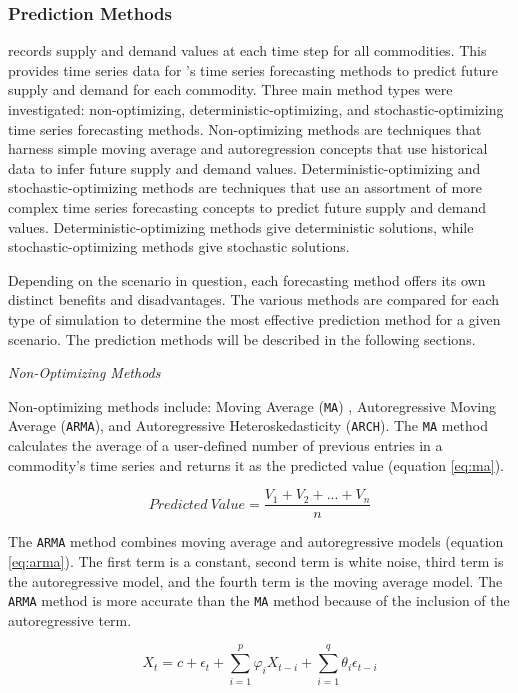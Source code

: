 \subsubsection{\textbf{Prediction Methods}}
\deploy records supply and demand values at each time step for all 
commodities. 
This provides time series data for \deploy's time series 
forecasting methods to predict future supply and demand for each 
commodity.  
Three main method types were investigated: non-optimizing, 
deterministic-optimizing, and stochastic-optimizing
time series forecasting methods.
Non-optimizing methods are techniques that harness 
simple moving average and autoregression concepts that use 
historical data to infer future supply and demand values. 
Deterministic-optimizing and stochastic-optimizing 
methods are techniques 
that use an assortment of more complex time series forecasting 
concepts to predict future supply and demand values. 
Deterministic-optimizing methods give deterministic solutions,
while stochastic-optimizing methods give stochastic solutions. 

Depending on the scenario in question, each forecasting method 
offers its own distinct benefits and disadvantages.
The various methods are compared for each type of simulation 
to determine the most effective prediction method for 
a given scenario.  
The prediction methods will be described in the following 
sections. 

\noindent
\textit{Non-Optimizing Methods}

Non-optimizing methods include: Moving Average (\texttt{MA})
, Autoregressive Moving Average (\texttt{ARMA}), and 
Autoregressive Heteroskedasticity (\texttt{ARCH}). 
The \texttt{MA} method calculates the average of 
a user-defined number of previous entries in a commodity's 
time series and returns it as the predicted value 
(equation \ref{eq:ma}).

\begin{equation}
	\label{eq:ma}
	Predicted\ Value = \frac{V_1+V_2+...+V_n}{n}
\end{equation}

The \texttt{ARMA} method combines moving average and
autoregressive models (equation \ref{eq:arma}).
The first term is a constant, second term is 
white noise, third term is the autoregressive
model, and the fourth term is the moving average
model.
The \texttt{ARMA} method is more accurate than the 
\texttt{MA} method 
because of the inclusion of the autoregressive term. 

\begin{equation}
	\label{eq:arma}
	X_t = c + \epsilon_t + 
	\sum_{i=1}^p\varphi_i X_{t-i} +	
	\sum_{i=1}^q\theta_i\epsilon_{t-i}
\end{equation}

